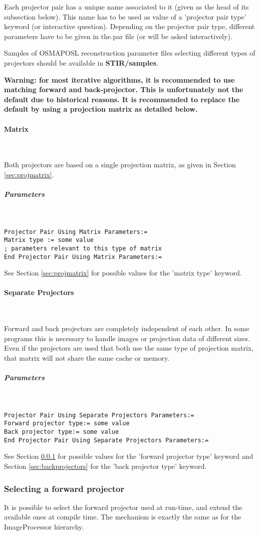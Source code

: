 \documentclass{article}
\newcommand{\subsubsubsection}[1]{\paragraph{#1}\mbox{} \\}
\newcommand{\subsubsubsubsection}[1]{\subparagraph{#1} \mbox{} \\}
\begin{document}
{{{Each projector pair has a unique name associated to it (given 
as the head of its subsection below). This name has to be used 
as value of a 'projector pair type' keyword (or interactive question). 
Depending on the projector pair type, different parameters have 
to be given in the.par file (or will be asked interactively).


Samples of OSMAPOSL reconstruction parameter files selecting 
different types of projectors should be available in \textbf{STIR/samples}.

\textbf{Warning: for most iterative algorithms, it is recommended 
to use matching forward and back-projector. This is unfortunately 
not the default due to historical reasons. It is recommended to replace
the default by using a projection matrix as detailed below.}

{ \subsubsubsection{Matrix}
}
\label{sec:projectorpairusingmatrix}
Both projectors are based on a single projection matrix, as given 
in Section \ref{sec:projmatrix}.

{ \subsubsubsubsection{Parameters}
}
\begin{verbatim}
Projector Pair Using Matrix Parameters:=
Matrix type := some value
; parameters relevant to this type of matrix
End Projector Pair Using Matrix Parameters:=
\end{verbatim}

See Section \ref{sec:projmatrix} for possible values for the 'matrix type' keyword.

{ \subsubsubsection{Separate Projectors }
}
Forward and back projectors are completely independent of each 
other. In some programs this is necessary to handle images or 
projection data of different sizes. \\
Even if the projectors are used that both use the same type of 
projection matrix, that matrix will not share the same cache 
or memory.

{ \subsubsubsubsection{Parameters}
}
\begin{verbatim}
Projector Pair Using Separate Projectors Parameters:=
Forward projector type:= some value
Back projector type:= some value
End Projector Pair Using Separate Projectors Parameters:=
\end{verbatim}

See Section \ref{sec:forwardprojectors} for possible values for the 'forward projector 
type' keyword and Section \ref{sec:backprojectors} for the 'back projector type' 
keyword.


\subsubsection{
Selecting a forward projector}
\label{sec:forwardprojectors}
It is possible to select the forward projector used at run-time, 
and extend the available ones at compile time. The mechanism 
is exactly the same as for the ImageProcessor hierarchy.


}}}
\end{document}
